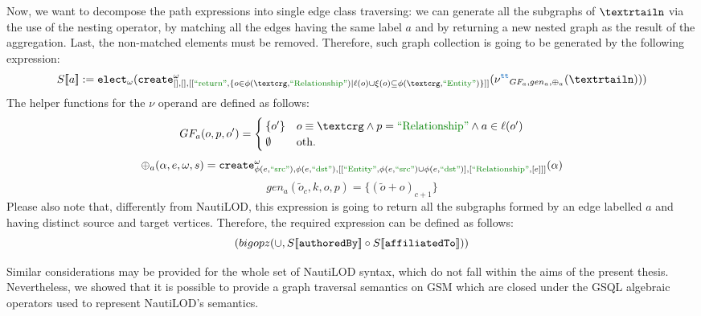 \begin{example}
Now, we want to decompose the path expressions into single edge class traversing: we can generate all the subgraphs of $\nested$ via the use of the nesting operator, by matching all the edges having the same label $a$ and by returning a new nested graph as the result of the aggregation. Last, the non-matched elements must be removed. 
Therefore, such graph collection is going to be generated by the following expression:
\[S\jsem{a}:=\texttt{elect}_\omega(\texttt{create}^\omega_{[],[],[[\mstr{return},\{o\in \phi(\ngraph,\RELA)|\ell(o)\cup\xi(o)\subseteq\phi(\ngraph,\ONTA)\}]]}(\nu^{\color{RoyalBlue}\texttt{tt}}_{GF_a,gen_a,\oplus_a}(\nested)))\]
The helper functions for the $\nu$ operand are defined as follows:
\[GF_a(o,p,o')=\begin{cases}
\{o'\} & o\equiv \ngraph\wedge p=\RELA\wedge a\in\ell(o')\\
\emptyset & \textup{oth.}\\
\end{cases}\]
\[\oplus_a(\alpha,e,\omega,s)=\texttt{create}^\omega_{\phi(e,\SRC),\phi(e,\DST),[[\ONTA,\phi(e,\SRC)\cup\phi(e,\DST)],[\RELA,[e]]]}(\alpha)\]
\[gen_a(\tilde{o}_c,k,o,p)=\{(\tilde{o}+o)_{c+1}\}\]
Please also note that, differently from NautiLOD, this expression is going to return all the subgraphs formed by an edge labelled $a$ and having distinct source and target vertices. Therefore, the required expression can be defined as follows:
\[ \left(bigopz(\cup, S[\! [\texttt{authoredBy}]\!]\circ S[\! [\texttt{affiliatedTo}]\!])\right) \]
\end{example}


Similar considerations may be provided for the whole set of NautiLOD syntax, which  do not fall within the aims of the present thesis. Nevertheless, we showed that it is possible to provide a graph traversal semantics on GSM which are closed under the GSQL algebraic operators used to represent NautiLOD's semantics.

